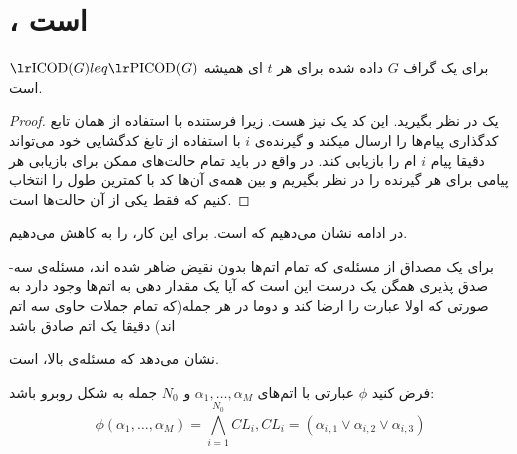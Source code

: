 \section{
\lpicod
،
\nphard
 است
}

\begin{lemma}
برای یک گراف
$G$
داده شده برای هر
$t$
ای همیشه
 $\text{\icodg} leq \text{\picodg}$
 است.
 \cite{pliablefirstpaper}
\end{lemma}
\begin{proof}
	یک 
	\icod
	در نظر بگیرید. این کد یک
	\picod
	نیز هست. زیرا فرستنده با استفاده از همان تابع کدگذاری پیام‌ها را ارسال میکند و گیرنده‌ی
	$i$
	با استفاده از تابغ کدگشایی خود می‌تواند دقیقا	 پیام
	$i$
	ام را بازیابی کند. در واقع در
	\picod
	باید تمام حالت‌های ممکن برای بازیابی هر پیامی برای هر گیرنده را در نظر بگیریم و بین همه‌ی آن‌ها کد با کمترین طول را انتخاب کنیم که 
	\icod
	فقط یکی از آن حالت‌ها است.
\end{proof}

در ادامه نشان می‌دهیم که
\nphard
است. برای این کار، 
\lpicod
 را به
کاهش می‌دهیم.

\begin{definition}
	برای یک مصداق از مسئله‌ی 
که تمام اتم‌ها بدون نقیض ضاهر شده اند، مسئله‌ی سه-صدق پذیری همگن یک درست این است که آیا یک مقدار دهی به اتم‌ها وجود دارد به صورتی که اولا عبارت را ارضا کند و دوما در هر جمله(که تمام جملات حاوی سه اتم اند) دقیقا یک اتم صادق باشد
\end{definition}

\cite{10.1145/800133.804350}
نشان می‌دهد که مسئله‌ی بالا، 
\nphard
است.

فرض کنید
$\phi$
عبارتی با اتم‌های
$\alpha_1, \ldots, \alpha_M$
و
$N_0$
جمله به شکل روبرو باشد:
$$\phi(\alpha_1, \ldots, \alpha_M) = \bigwedge\limits_{i = 1}^{N_0} CL_i, CL_i = (\alpha_{i, 1} \vee \alpha_{i, 2} \vee \alpha_{i, 3})$$

